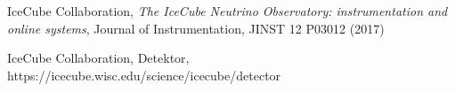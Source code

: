 \begin{thebibliography}{99}
 IceCube Collaboration, \textit{The IceCube Neutrino Observatory: instrumentation and online systems}, Journal of Instrumentation, JINST 12 P03012 (2017)

 IceCube Collaboration, Detektor, https://icecube.wisc.edu/science/icecube/detector
\end{thebibliography}
